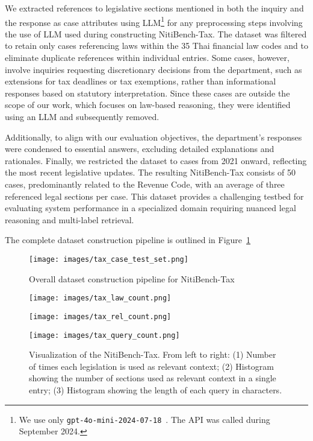 We extracted references to legislative sections mentioned in both the inquiry and the response as case attributes using LLM\footnote{We use only \texttt{gpt-4o-mini-2024-07-18}~\cite{gpt4o}. The API was called during September 2024.} for any preprocessing steps involving the use of LLM used during constructing NitiBench-Tax. 
%
The dataset was filtered to retain only cases referencing laws within the 35 Thai financial law codes and to eliminate duplicate references within individual entries. 
%
Some cases, however, involve inquiries requesting discretionary decisions from the department, such as extensions for tax deadlines or tax exemptions, rather than informational responses based on statutory interpretation. 
%
Since these cases are outside the scope of our work, which focuses on law-based reasoning, they were identified using an LLM and subsequently removed.

Additionally, to align with our evaluation objectives, the department's responses were condensed to essential answers, excluding detailed explanations and rationales.
%
Finally, we restricted the dataset to cases from 2021 onward, reflecting the most recent legislative updates. 
%
The resulting NitiBench-Tax consists of 50 cases, predominantly related to the Revenue Code, with an average of three referenced legal sections per case. 
%
This dataset provides a challenging testbed for evaluating system performance in a specialized domain requiring nuanced legal reasoning and multi-label retrieval.

The complete dataset construction pipeline is outlined in Figure~\ref{fig:tax_pipeline}

\begin{figure}[H]
    \centering
    \texttt{[image: images/tax\_case\_test\_set.png]}
    
    \caption{Overall dataset construction pipeline for NitiBench-Tax}
    \label{fig:tax_pipeline}
\end{figure}




\begin{figure}[H]
    \centering
    \begin{minipage}{0.34\textwidth}
        \centering
        \texttt{[image: images/tax\_law\_count.png]}
    \end{minipage}%
    \hfill
    \begin{minipage}{0.31\textwidth}
        \centering
        \texttt{[image: images/tax\_rel\_count.png]}
    \end{minipage}%
    \hfill
    \begin{minipage}{0.31\textwidth}
        \centering
        \texttt{[image: images/tax\_query\_count.png]}
    \end{minipage}

    \caption{Visualization of the NitiBench-Tax. From left to right: (1) Number of times each legislation is used as relevant context; (2) Histogram showing the number of sections used as relevant context in a single entry; (3) Histogram showing the length of each query in characters.}
    \label{fig:tax_combined}
\end{figure}

